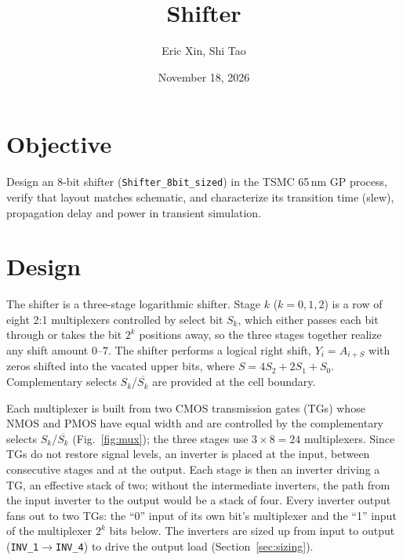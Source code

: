 \documentclass[11pt]{article}
\title{Shifter}
\author{Eric Xin, Shi Tao}
\date{November 18, 2026}
\begin{document}
\maketitle

\section{Objective}
Design an 8-bit shifter (\texttt{Shifter\_8bit\_sized}) in the TSMC 65\,nm GP
process, verify that layout matches schematic, and characterize its
transition time (slew), propagation delay and power in transient simulation.

\section{Design}
The shifter is a three-stage logarithmic shifter. Stage $k$ ($k=0,1,2$) is a
row of eight 2:1 multiplexers controlled by select bit $S_k$, which either
passes each bit through or takes the bit $2^k$ positions away, so the three
stages together realize any shift amount $0$--$7$. The shifter performs a
logical right shift, $Y_i = A_{i+S}$ with zeros shifted into the vacated
upper bits, where $S = 4S_2 + 2S_1 + S_0$. Complementary selects
$S_k$/$\overline{S_k}$ are provided at the cell boundary.

Each multiplexer is built from two CMOS transmission gates (TGs) whose NMOS
and PMOS have equal width and are controlled by the complementary selects
$S_k$/$\overline{S_k}$ (Fig.~\ref{fig:mux}); the three stages use
$3 \times 8 = 24$ multiplexers. Since TGs do not restore signal levels, an
inverter is placed at the input, between consecutive stages and at the output.
Each stage is then an inverter driving a TG, an effective stack of two;
without the intermediate inverters, the path from the input inverter to the
output would be a stack of four. Every inverter output fans out to two TGs:
the ``0'' input of its own bit's multiplexer and the ``1'' input of the
multiplexer $2^k$ bits below. The inverters are sized up from input to output
(\texttt{INV\_1}$\rightarrow$\texttt{INV\_4}) to drive the output load
(Section~\ref{sec:sizing}).
\end{document}
